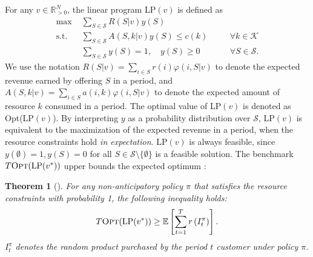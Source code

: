 \documentclass{article}
\newtheorem{theorem}{Theorem}[section]
\theoremstyle{definition}
\newcommand{\EEE}{\mathbb{E}}
\newcommand{\KKK}{\mathcal{K}}
\newcommand{\RRR}{\mathbb{R}}
\newcommand{\SSS}{\mathcal{S}}
\begin{document}
For any $v\in \RRR^N_{>0}$, the linear program LP$(v)$ is defined as
\begin{subequations}\label{LP:MNL}
\begin{alignat}{3}
\text{max }    &\sum_{S\in \SSS} R(S | v )y(S) \nonumber\\
\text{s.t. }   &\sum_{S\in \SSS} A(S, k | v)y(S) \leq c(k)       &\quad &\forall k \in \KKK \nonumber\\
&\sum_{S\in \SSS}y(S) = 1, \quad y(S)\geq   0 &\quad & \forall S\in \SSS.\nonumber
\end{alignat}
\end{subequations}
We use the notation $R(S|v) = \sum_{i\in S}r(i)\varphi(i, S|v)$ to denote the expected revenue earned by offering $S$ in a period, and $A(S, k|v) = \sum_{i\in S}a(i, k)\varphi(i, S|v)$ to denote the expected amount of resource $k$ consumed in a period. The optimal value of LP$(v)$ is denoted as {\sc Opt}(LP$(v)$). By interpreting $y$ as a probability distribution over $\SSS$, LP$(v)$ is equivalent to the maximization of the expected revenue in a period, when the resource constraints hold \emph{in expectation}. LP$(v)$ is always feasible, since $y(\emptyset) = 1, y(S) = 0$ for all $S \in \SSS\setminus \{\emptyset\}$ is a feasible solution. The benchmark $T\text{{\sc Opt}}(\text{LP}(v^*))$ upper bounds the expected optimum \cite{BadanidiyuruKS13}:
\begin{theorem}[\cite{BadanidiyuruKS13}]
For any non-anticipatory policy $\pi$ that satisfies the resource constraints with probability 1, the following inequality holds:
\begin{equation*}
T\text{{\sc Opt}}(\text{LP}(v^*)) \geq \EEE\left[ \sum^T_{t = 1}r\left(I^\pi_t\right)\right].
\end{equation*}
$I^\pi_t$ denotes the random product purchased by the period $t$ customer under policy $\pi$.
\end{theorem}
\end{document}
